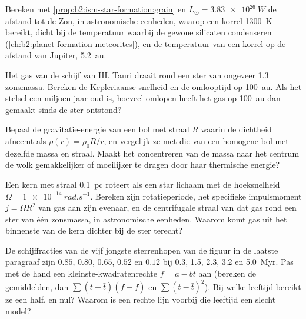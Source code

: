 \begin{exercise}[$\star\star$]\label{exo:b2:ism-star-formation:8}
Bereken met \cref{prop:b2:ism-star-formation:grain} en $L_\odot = \qty{3.83e26}{W}$
de afstand tot de Zon, in astronomische eenheden, waarop een korrel
\qty{1300}{K} bereikt, dicht bij de temperatuur waarbij de gewone silicaten
condenseren (\cref{ch:b2:planet-formation-meteorites}), en
de temperatuur van een korrel op de afstand van Jupiter, \qty{5.2}{au}.
\end{exercise}

\begin{exercise}[$\star\star$]\label{exo:b2:ism-star-formation:9}
Het gas van de schijf van HL Tauri draait rond een ster van ongeveer \num{1.3}
zonsmassa. Bereken de Kepleriaanse snelheid en de omlooptijd op \qty{100}{au}.
Als het stelsel een miljoen jaar oud is, hoeveel omlopen heeft het gas op
\qty{100}{au} dan gemaakt sinds de ster ontstond?
\end{exercise}

\begin{exercise}[$\star\star\star$]\label{exo:b2:ism-star-formation:10}
Bepaal de gravitatie-energie van een bol met straal $R$ waarin de dichtheid
afneemt als $\rho(r) = \rho_0 R/r$, en vergelijk ze met die van een homogene bol met
dezelfde massa en straal. Maakt het concentreren van de massa naar het centrum
de wolk gemakkelijker of moeilijker te dragen door haar thermische energie?
\end{exercise}

\begin{exercise}[$\star\star\star$]\label{exo:b2:ism-star-formation:11}
Een kern met straal \qty{0.1}{pc} roteert als een star lichaam met de hoeksnelheid
$\Omega = \qty{1e-14}{rad.s^{-1}}$. Bereken zijn rotatieperiode, het specifieke
impulsmoment $j = \Omega R^2$ van gas aan zijn evenaar, en de centrifugale
straal van dat gas rond een ster van één zonsmassa, in astronomische eenheden.
Waarom komt gas uit het binnenste van de kern dichter bij de ster terecht?
\end{exercise}

\begin{exercise}[$\star\star\star$]\label{exo:b2:ism-star-formation:12}
De schijffracties van de vijf jongste sterrenhopen van de figuur in de laatste
paragraaf zijn $0.85$, $0.80$, $0.65$, $0.52$ en $0.12$ bij 0.3, 1.5, 2.3, 3.2 en
\qty{5.0}{Myr}. Pas met de hand een kleinste-kwadratenrechte $f = a - bt$ aan
(bereken de gemiddelden, dan $\sum(t - \bar t)(f - \bar f)$ en
$\sum(t - \bar t)^2$). Bij welke leeftijd bereikt ze een half, en nul? Waarom is een
rechte lijn voorbij die leeftijd een slecht model?
\end{exercise}

